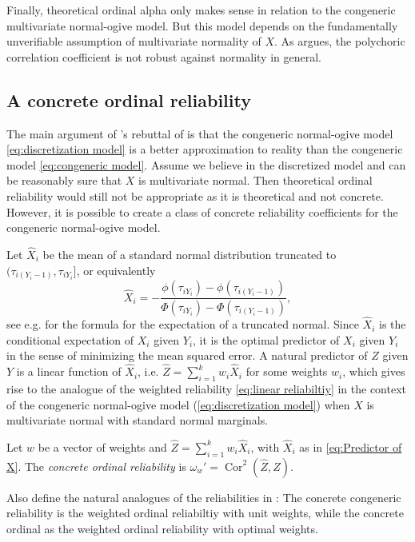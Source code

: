 \documentclass[twoside]{article}
\DeclareMathOperator{\Cor}{Cor}
\begin{document}
Finally, theoretical ordinal alpha only makes sense in relation to
the congeneric multivariate normal-ogive model. But this model depends on
the fundamentally unverifiable assumption of multivariate normality
of $X$. As \citet{Foldnes2019-yd} argues, the polychoric correlation coefficient is not robust against normality in general.

\subsection{A concrete ordinal reliability}

The main argument of \citet{Zumbo2019-lm}'s rebuttal of \citet{Chalmers2018-fj}
is that the congeneric normal-ogive model \eqref{eq:discretization model} 
is a better approximation to reality than the congeneric model \eqref{eq:congeneric model}.
Assume we believe in the discretized model and can be reasonably
sure that $X$ is multivariate normal. Then theoretical ordinal reliability would still
not be appropriate as it is theoretical and not concrete. However,
it is possible to create a class of concrete reliability coefficients for the
congeneric normal-ogive model.

Let $\hat{X}_{i}$ be the mean of a standard normal distribution
truncated to $(\tau_{i(Y_{i}-1)},\tau_{iY_{i}}]$, or equivalently
\begin{equation}
\hat{X}_{i}=-\frac{\phi(\tau_{iY_{i}})-\phi(\tau_{i(Y_{i}-1)})}{\Phi(\tau_{iY_{i}})-\Phi(\tau_{i(Y_{i}-1)})},\label{eq:Predictor of X}
\end{equation}
see e.g. \citet[Section 10.1]{Johnson1994-ag} for the formula for the
expectation of a truncated normal. Since $\hat{X}_{i}$ is the
conditional expectation of $X_{i}$ given $Y_{i}$, it is the optimal
predictor of $X_{i}$ given $Y_{i}$ in the sense of minimizing the
mean squared error. A natural predictor of $Z$ given $Y$ is a linear
function of $\hat{X}_{i}$, i.e. $\hat{Z} = \sum_{i=1}^{k}w_{i}\hat{X}_{i}$
for some weights $w_{i}$, which gives rise to the analogue of the
weighted reliability \eqref{eq:linear reliabiltiy} in the context of the congeneric normal-ogive model
(\ref{eq:discretization model}) when $X$ is multivariate normal
with standard normal marginals. 
\begin{defn}\label{defn:concrete ordinal reliability}
Let $w$ be a vector of weights and $\hat{Z}=\sum_{i=1}^{k}w_{i}\hat{X}_{i}$, with $\hat{X}_i$ as in \eqref{eq:Predictor of X}. The \textit{concrete ordinal reliability} is $\omega_{w}'=\Cor^2(\hat{Z},Z)$.
\end{defn}
Also define the natural analogues of the reliabilities in : The concrete congeneric reliability is the weighted ordinal reliabiltiy with unit weights, while the concrete ordinal  as the weighted ordinal reliability with optimal weights.  
\end{document}
